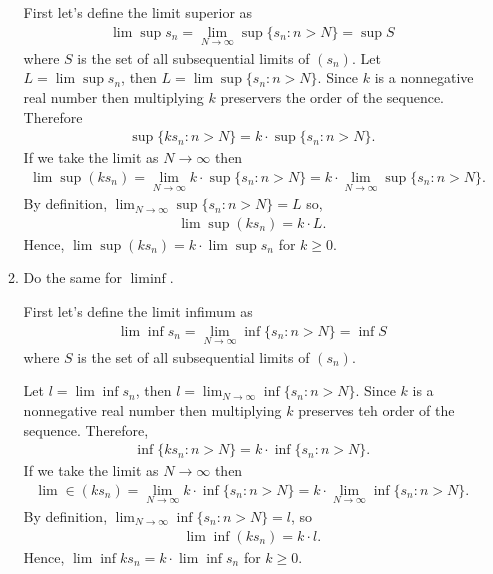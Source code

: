 \documentclass [10pt]{article}
\newcommand{\jg}[1]{{\color{blue} #1}}
\begin{document}
\begin{enumerate}
\begin{enumerate}
\jg{
First let's define the limit superior as 
\begin{align*}
    \lim \sup s_n = \lim_{N \rightarrow \infty} \sup \{ s_n : n > N \} = \sup S
\end{align*}
where $S$ is the set of all subsequential limits of $(s_n)$. Let $L = \lim \sup s_n$, then $L = \lim \sup \{ s_n : n > N\}$. Since $k$ is a nonnegative real number then multiplying $k$ preservers the order of the sequence. Therefore 
\begin{align*}
    \sup \{ k s_n : n > N\} = k \cdot \sup \{ s_n : n > N \}. 
\end{align*}
If we take the limit as $N \rightarrow \infty$ then 
\begin{align*}
    \lim \sup (k s_n) = \lim_{N \rightarrow \infty} k \cdot \sup \{ s_n : n > N \} = k \cdot \lim_{N \rightarrow \infty} \sup \{ s_n : n > N \}. 
\end{align*}
By definition, $\lim_{N \rightarrow \infty} \sup \{s_n : n > N \} = L$ so, 
\begin{align*}
    \lim \sup (k s_n) = k \cdot L. 
\end{align*}
Hence, $\lim \sup (k s_n) = k \cdot \lim \sup s_n$ for $k \geq 0$. 
}
\item Do the same for $\liminf$. 

\jg{
First let's define the limit infimum as 
\begin{align*}
    \lim \inf s_n = \lim_{N \rightarrow \infty} \inf \{ s_n : n > N \} = \inf S
\end{align*}
where $S$ is the set of all subsequential limits of $(s_n)$. 

Let $l = \lim \inf s_n$, then $l = \lim_{N \rightarrow \infty} \inf \{s_n : n > N \}$. Since $k$ is a nonnegative real number then multiplying $k$ preserves teh order of the sequence. Therefore, 
\begin{align*}
    \inf \{ k s_n : n > N \} = k \cdot \inf \{ s_n : n > N \}. 
\end{align*}
If we take the limit as $N \rightarrow \infty$ then 
\begin{align*}
    \lim \in (k s_n) = \lim_{N \rightarrow \infty} k \cdot \inf \{ s_n : n > N \} = k \cdot \lim_{N \rightarrow \infty} \inf \{ s_n : n > N \}. 
\end{align*}
By definition, $\lim_{N \rightarrow \infty} \inf \{s_n : n > N \} = l$, so 
\begin{align*}
    \lim \inf (k s_n) = k \cdot l. 
\end{align*}
Hence, $\lim \inf k s_n = k \cdot \lim \inf s_n$ for $k \geq 0$. 
}


\end{enumerate}
\end{enumerate}
\end{document}
